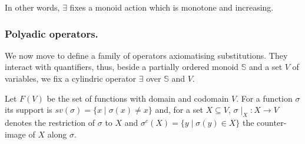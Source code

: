 \documentclass{llncs}
\def\monid{{\mathbf 0}}
\def\monid{\mathbf{1}}
\begin{document}
In other words, $\exists$ fixes a monoid action which is monotone and increasing.
%
%
%
%
%
%

\subsubsection{Polyadic operators.}
We now move to define a family of operators axiomatising substitutions.  
They interact with quantifiers, thus, beside a partially ordered monoid $\mathbb{S}$
and a set $V$ of variables, we fix a cylindric operator $\exists$ over ${\mathbb S}$ and $V$.

Let $F(V)$ be the set of functions with domain and codomain $V$.
For a function $\sigma$ %
its support is $sv(\sigma) = \{x \mid \sigma(x) \neq x\}$
and, for a set $X \subseteq V$,
$\sigma \mid_{X}: X \rightarrow V$ denotes the restriction of $\sigma$ to $X$
and $\sigma^{c}(X) = \{ y \mid \sigma(y) \in X\}$ the counter-image 
of $X$ along $\sigma$.
\end{document}
